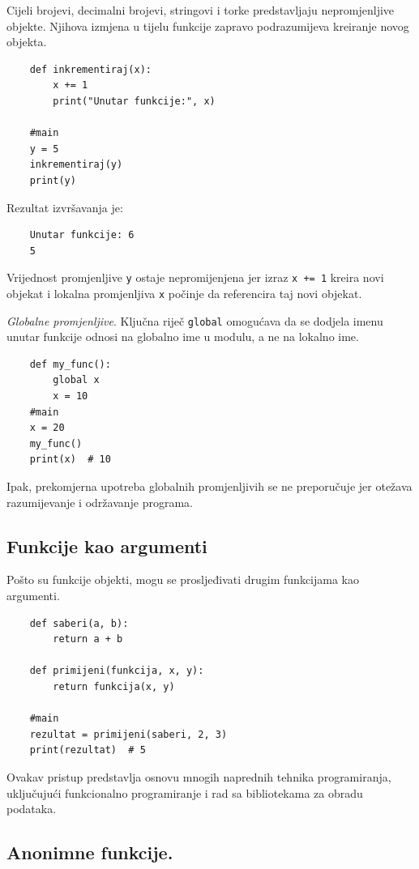 Cijeli brojevi, decimalni brojevi, stringovi i torke predstavljaju nepromjenljive objekte. Njihova izmjena u tijelu funkcije zapravo podrazumijeva kreiranje novog objekta.

\begin{verbatim}
	def inkrementiraj(x):
	    x += 1
	    print("Unutar funkcije:", x)
	
	#main
	y = 5	
	inkrementiraj(y)
	print(y)
\end{verbatim}

Rezultat izvršavanja je:
\begin{verbatim}
	Unutar funkcije: 6
	5
\end{verbatim}

Vrijednost promjenljive \texttt{y} ostaje nepromijenjena jer izraz \texttt{x += 1} kreira novi objekat i lokalna promjenljiva \texttt{x} počinje da referencira taj novi objekat.

\textit{Globalne promjenljive}. Ključna riječ \texttt{global} omogućava da se dodjela imenu unutar funkcije odnosi na globalno ime u modulu, a ne na lokalno ime. 

\begin{verbatim}
	def my_func():
	    global x
	    x = 10
	#main
	x = 20
	my_func()
	print(x)  # 10
\end{verbatim}
Ipak, prekomjerna upotreba globalnih promjenljivih se ne preporučuje jer otežava razumijevanje i održavanje programa.

\subsection{Funkcije kao argumenti}

Pošto su funkcije objekti, mogu se prosljeđivati drugim funkcijama kao argumenti.

\begin{verbatim}
	def saberi(a, b):
	    return a + b
	
	def primijeni(funkcija, x, y):
	    return funkcija(x, y)
	
	#main
	rezultat = primijeni(saberi, 2, 3)
	print(rezultat)  # 5
\end{verbatim}

Ovakav pristup predstavlja osnovu mnogih naprednih tehnika programiranja, uključujući funkcionalno programiranje i rad sa bibliotekama za obradu podataka.


\subsection{Anonimne funkcije.} 

